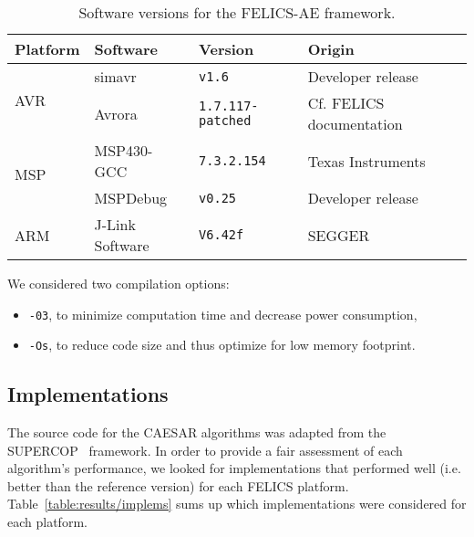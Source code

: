 \documentclass{article}
\begin{document}
\begin{table}[H]
  \centering
  \begin{tabular}{l|l|l|l}
    \textbf{Platform} & \textbf{Software} & \textbf{Version}         & \textbf{Origin}                               \\
    \hline
    \multirow{2}{*}{AVR}
                      & simavr            & \texttt{v1.6}            & Developer release~\cite{FELICS:simavr}        \\
                      & Avrora            & \texttt{1.7.117-patched} & Cf. FELICS documentation~\cite{FELICS:avrora} \\
    \hline
    \multirow{2}{*}{MSP}
                      & MSP430-GCC        & \texttt{7.3.2.154}       & Texas Instruments~\cite{FELICS:msp430-gcc}    \\
                      & MSPDebug          & \texttt{v0.25}           & Developer release~\cite{FELICS:mspdebug}      \\
    \hline
    \multirow{1}{*}{ARM}
                      & J-Link Software   & \texttt{V6.42f}          & SEGGER~\cite{FELICS:jlink-soft}               \\
    \hline
  \end{tabular}
  \caption{Software versions for the FELICS-AE framework.}
  \label{table:results/setup}
\end{table}

We considered two compilation options:

\begin{itemize}
\item \texttt{-03}, to minimize computation time and decrease power
  consumption,
\item \texttt{-Os}, to reduce code size and thus optimize for low
  memory footprint.
\end{itemize}

\subsection{Implementations}
\label{sec:results/implementations}

The source code for the CAESAR algorithms was adapted from the
SUPERCOP~\cite{CAESAR:SUPERCOP} framework.  In order to provide a fair
assessment of each algorithm's performance, we looked for
implementations that performed well (i.e. better than the reference
version) for each FELICS platform.  Table~\ref{table:results/implems}
sums up which implementations were considered for each platform.
\end{document}
